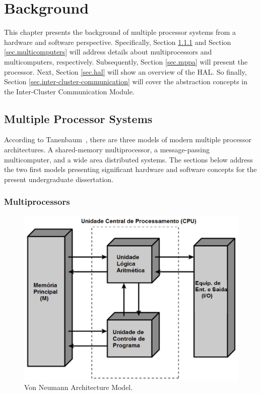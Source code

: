 \chapter{Background}
\label{ch.fundamentation}

	This chapter presents the background of multiple processor
	systems from a hardware and software perspective.
	Specifically, Section \ref{sec.multiprocessors} and Section \ref{sec.multicomputers}
	will address details about multiprocessors and multicomputers, respectively.
	Subsequently, Section \ref{sec.mppa} will present the \mppa processor.
	Next, Section \ref{sec.hal} will show an overview of the HAL.
	So finally, Section \ref{sec.inter-cluster-communication} will cover the abstraction
	concepts in the Inter-Cluster Communication Module.


\section{Multiple Processor Systems}
\label{sec.multiple-processor-systems}

	According to Tanenbaum~\cite{tanenbaum:4ed}, there are three models of
	modern multiple processor architectures.
	A shared-memory multiprocessor, a message-passing multicomputer, and a wide
	area distributed systems.
	The sections below address the two first models presenting significant
	hardware and software concepts for the present undergraduate dissertation.

	\subsection{Multiprocessors}
	\label{sec.multiprocessors}

		\begin{figure}[h]
			\centering
			\includegraphics[width=.6\textwidth]{images/neumann.jpg}

			\caption{
				Von Neumann Architecture Model.
			}\par
			\label{fig.neumann}
		\end{figure}

